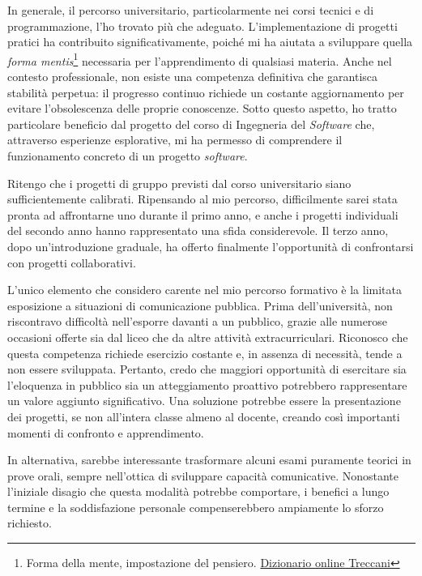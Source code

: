     \vspace{0.2 em}
    \noindent In generale, il percorso universitario, particolarmente nei corsi tecnici e di programmazione, l'ho trovato più che adeguato. L'implementazione di progetti pratici ha contribuito significativamente, poiché mi ha aiutata a sviluppare quella \textit{forma mentis}\footnote{Forma della mente, impostazione del pensiero. \href{https://www.treccani.it/vocabolario/forma-mentis/}{Dizionario online Treccani}} necessaria per l'apprendimento di qualsiasi materia. Anche nel contesto professionale, non esiste una competenza definitiva che garantisca stabilità perpetua: il progresso continuo richiede un costante aggiornamento per evitare l'obsolescenza delle proprie conoscenze. Sotto questo aspetto, ho tratto particolare beneficio dal progetto del corso di Ingegneria del \textit{Software} che, attraverso esperienze esplorative, mi ha permesso di comprendere il funzionamento concreto di un progetto \textit{software}.

    \vspace{0.2 em}
    \noindent Ritengo che i progetti di gruppo previsti dal corso universitario siano sufficientemente calibrati. Ripensando al mio percorso, difficilmente sarei stata pronta ad affrontarne uno durante il primo anno, e anche i progetti individuali del secondo anno hanno rappresentato una sfida considerevole. Il terzo anno, dopo un'introduzione graduale, ha offerto finalmente l'opportunità di confrontarsi con progetti collaborativi.

    \vspace{0.2 em}
    \noindent L'unico elemento che considero carente nel mio percorso formativo è la limitata esposizione a situazioni di comunicazione pubblica. Prima dell'università, non riscontravo difficoltà nell'esporre davanti a un pubblico, grazie alle numerose occasioni offerte sia dal liceo che da altre attività extracurriculari. Riconosco che questa competenza richiede esercizio costante e, in assenza di necessità, tende a non essere sviluppata. Pertanto, credo che maggiori opportunità di esercitare sia l'eloquenza in pubblico sia un atteggiamento proattivo potrebbero rappresentare un valore aggiunto significativo. Una soluzione potrebbe essere la presentazione dei progetti, se non all'intera classe almeno al docente, creando così importanti momenti di confronto e apprendimento.

    \vspace{0.2 em}
    \noindent In alternativa, sarebbe interessante trasformare alcuni esami puramente teorici in prove orali, sempre nell'ottica di sviluppare capacità comunicative. Nonostante l'iniziale disagio che questa modalità potrebbe comportare, i benefici a lungo termine e la soddisfazione personale compenserebbero ampiamente lo sforzo richiesto.

    

    